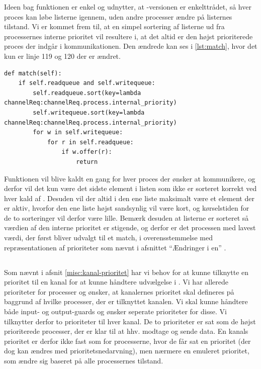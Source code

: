 Ideen bag funktionen  er enkel og  udnytter, at -versionen er enkelttrådet, så hver proces kan løbe listerne igennem, uden andre processer ændre på listernes tilstand.  Vi er kommet frem til, at  en simpel sortering af listerne ud fra processernes interne prioritet vil resultere i, at det altid er den højst prioriterede proces der indgår i kommunikationen. Den ændrede  kan ses i \cref{lst:match}, hvor det kun er linje 119 og 120 der er ændret.

\begin{lstlisting}[firstnumber=117 ,float=hbtp, label=lst:match, caption=Funktionen \code{match} der sorterer kanalrequests.]
def match(self):        
    if self.readqueue and self.writequeue:
        self.readqueue.sort(key=lambda channelReq:channelReq.process.internal_priority)
        self.writequeue.sort(key=lambda channelReq:channelReq.process.internal_priority)
        for w in self.writequeue:
            for r in self.readqueue:
                if w.offer(r):
                    return       
\end{lstlisting}

Funktionen  vil blive kaldt en gang for hver proces der ønsker at kommunikere, og derfor vil det kun være det sidste element i listen som ikke er sorteret korrekt ved hver kald af . Desuden vil der altid i den ene liste maksimalt være et element der er aktiv, hvorfor den ene liste højst sandsynlig vil være kort, og kørselstiden for de to sorteringer vil derfor være lille. Bemærk desuden at listerne er sorteret så værdien af den interne prioritet er stigende, og derfor er det processen med lavest værdi, der først bliver udvalgt til et match, i overensstemmelse med repræsentationen af prioriteter som nævnt i afsnittet ``Ændringer i \sched en'' .

\subsection{}

Som nævnt i afsnit \cref{misc:kanal-prioritet} har vi behov for at kunne tilknytte en prioritet til en kanal for at kunne håndtere udvælgelse i . Vi har allerede prioriteter for processer og ønsker, at kanalernes prioritet skal defineres på baggrund af hvilke processer, der er tilknyttet kanalen. Vi skal kunne håndtere både input- og output-guards og ønsker seperate prioriteter for disse. Vi tilknytter derfor to prioriteter til hver kanal. De to prioriteter er sat som  de højst prioriterede processer, der er klar til at hhv. modtage og sende data. En kanals prioritet er derfor ikke fast som for processerne, hvor de får sat en prioritet (der dog kan ændres med prioritetsnedarvning), men nærmere en emuleret prioritet, som ændre sig baseret på alle processernes tilstand. 

